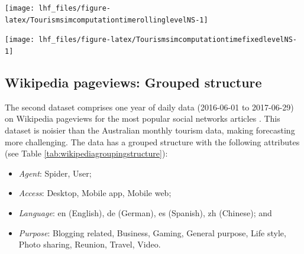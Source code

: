 \documentclass[11pt,a4paper,]{article}
\providecommand{\tightlist}{%
  \setlength{\itemsep}{0pt}\setlength{\parskip}{0pt}}
\let\origfigure\figure
\let\endorigfigure\endfigure
\renewenvironment{figure}[1][2] {
    \expandafter\origfigure\expandafter[!htbp]
} {
    \endorigfigure
}
\begin{document}
\begin{figure}

{\centering \texttt{[image: lhf\_files/figure-latex/TourismsimcomputationtimerollinglevelNS-1]} 

}

\caption{Computation time (seconds) for ETS, ARIMA and OLS with and without reconciliation - Rolling origin forecasts with 8, 10, 12 and 18 levels of hierarchy with 304, 608, 1520 and 3040 number of bottom level series - two years forecast points with 0.5 error value - Simulated tourism dataset.}\label{fig:TourismsimcomputationtimerollinglevelNS}
\end{figure}

\begin{figure}

{\centering \texttt{[image: lhf\_files/figure-latex/TourismsimcomputationtimefixedlevelNS-1]} 

}

\caption{Computation time (seconds) for ETS, ARIMA and OLS with and without reconciliation - Fixed origin forecasts with 8, 10, 12 and 18 levels of hierarchy with 304, 608, 1520 and 3040 number of bottom level series - two years forecast points with 0.5 error value - Simulated tourism dataset.}\label{fig:TourismsimcomputationtimefixedlevelNS}
\end{figure}

\FloatBarrier

\hypertarget{wikipedia-pageviews-grouped-structure}{%
\subsection{Wikipedia pageviews: Grouped structure}\label{wikipedia-pageviews-grouped-structure}}

The second dataset comprises one year of daily data (2016-06-01 to 2017-06-29) on Wikipedia pageviews for the most popular social networks articles \autocite{ashouri2018}. This dataset is noisier than the Australian monthly tourism data, making forecasting more challenging. The data has a grouped structure with the following attributes (see Table \ref{tab:wikipediagroupingstructure}):

\begin{itemize}
\tightlist
\item
  \emph{Agent}: Spider, User;
\item
  \emph{Access}: Desktop, Mobile app, Mobile web;
\item
  \emph{Language}: en (English), de (German), es (Spanish), zh (Chinese); and
\item
  \emph{Purpose}: Blogging related, Business, Gaming, General purpose, Life style, Photo sharing, Reunion, Travel, Video.
\end{itemize}
\end{document}
